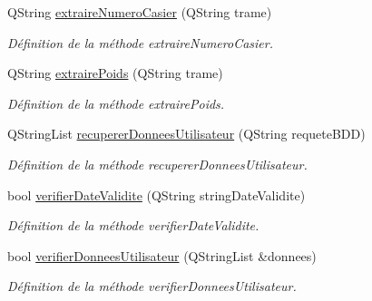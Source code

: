 \begin{DoxyCompactItemize}
Q\+String \hyperlink{class_supervision_a141a35024b0cb74636a8c6810a1ab26d}{extraire\+Numero\+Casier} (Q\+String trame)
\begin{DoxyCompactList}\small\item\em Définition de la méthode extraire\+Numero\+Casier. \end{DoxyCompactList}\item 
Q\+String \hyperlink{class_supervision_afdef41cd85f2ecfae9d1dc46f556a034}{extraire\+Poids} (Q\+String trame)
\begin{DoxyCompactList}\small\item\em Définition de la méthode extraire\+Poids. \end{DoxyCompactList}\item 
Q\+String\+List \hyperlink{class_supervision_a137b6c505742a4ada6ab38193eef01dd}{recuperer\+Donnees\+Utilisateur} (Q\+String requete\+B\+DD)
\begin{DoxyCompactList}\small\item\em Définition de la méthode recuperer\+Donnees\+Utilisateur. \end{DoxyCompactList}\item 
bool \hyperlink{class_supervision_acc886b933823993f1e3873582e05e690}{verifier\+Date\+Validite} (Q\+String string\+Date\+Validite)
\begin{DoxyCompactList}\small\item\em Définition de la méthode verifier\+Date\+Validite. \end{DoxyCompactList}\item 
bool \hyperlink{class_supervision_ae3400dad53c52bc09198e8d7f80e0e67}{verifier\+Donnees\+Utilisateur} (Q\+String\+List \&donnees)
\begin{DoxyCompactList}\small\item\em Définition de la méthode verifier\+Donnees\+Utilisateur. \end{DoxyCompactList}\end{DoxyCompactItemize}
